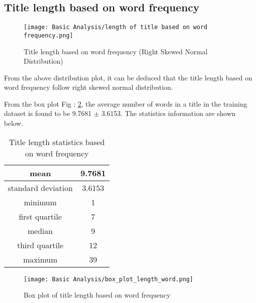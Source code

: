 \subsection{Title length based on word frequency}

\begin{figure}[H]
    \centering
    \texttt{[image: Basic Analysis/length of title based on word frequency.png]}
    \caption{Title length based on word frequency
        (Right Skewed Normal Distribution)}
    \label{fig:Title length based on word frequency}
\end{figure}

From the above distribution plot, it can be deduced that the title length based on word frequency follow right skewed normal distribution.

From the box plot Fig : \ref{fig:Box plot of title length based on word frequency}, the average number of words in a title in the training dataset is found to be 9.7681 $\pm$ 3.6153. The statistics information are shown below.

\begin{table}[H]
    \begin{center}
        \begin{tabular}{ |c|c| }
            \hline
            mean               & 9.7681 \\
            \hline
            standard deviation & 3.6153 \\
            \hline
            minimum            & 1      \\
            \hline
            first quartile     & 7      \\
            \hline
            median             & 9      \\
            \hline
            third quartile     & 12     \\
            \hline
            maximum            & 39     \\
            \hline
        \end{tabular}
    \end{center}
    \caption{Title length statistics based on word frequency}
    \label{table:Title length statistics based on word frequency}
\end{table}

\begin{figure}[H]
    \centering
    \texttt{[image: Basic Analysis/box\_plot\_length\_word.png]}
    \caption{Box plot of title length based on word frequency}
    \label{fig:Box plot of title length based on word frequency}
\end{figure}

